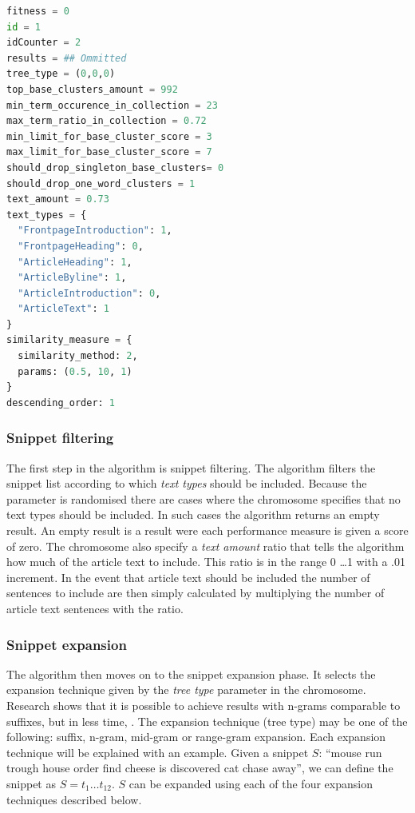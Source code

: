 \begin{lstlisting}[float=ht!, language=python, label=lst:chromosome, caption={An example chromosome}]
fitness = 0
id = 1
idCounter = 2
results = ## Ommitted
tree_type = (0,0,0)
top_base_clusters_amount = 992
min_term_occurence_in_collection = 23
max_term_ratio_in_collection = 0.72
min_limit_for_base_cluster_score = 3
max_limit_for_base_cluster_score = 7
should_drop_singleton_base_clusters= 0
should_drop_one_word_clusters = 1
text_amount = 0.73
text_types = {
  "FrontpageIntroduction": 1,
  "FrontpageHeading": 0,
  "ArticleHeading": 1,
  "ArticleByline": 1,
  "ArticleIntroduction": 0,
  "ArticleText": 1
}
similarity_measure = {
  similarity_method: 2,
  params: (0.5, 10, 1)
}
descending_order: 1
\end{lstlisting}

\subsubsection{Snippet filtering}
\label{subsubsec:snippetfiltering}
The first step in the \CTC algorithm is snippet filtering. The algorithm filters the snippet list according to which \emph{text types} should be included. Because the parameter is randomised there are cases where the chromosome specifies that no text types should be included. In such cases the algorithm returns an empty result. An empty result is a result were each performance measure is given a score of zero. The chromosome also specify a \emph{text amount} ratio that tells the algorithm how much of the article text to include. This ratio is in the range 0 \dots 1 with a .01 increment. In the event that article text should be included the number of sentences to include are then simply calculated by multiplying the number of article text sentences with the ratio.

\subsubsection{Snippet expansion}
\label{subsubsec:snippetexpansion}
The algorithm then moves on to the snippet expansion phase. It selects the expansion technique given by the \emph{tree type} parameter in the chromosome. Research shows that it is possible to achieve results with n-grams comparable to suffixes, but in less time, \parencite{Moe2014compact,Moe2014}. The expansion technique (tree type) may be one of the following: suffix, n-gram, mid-gram or range-gram expansion. Each expansion technique will be explained with an example. Given a snippet \(S\): ``mouse run trough house order find cheese is discovered cat chase away'', we can define the snippet as \(S = t_{1} \dots t_{12}\). \(S\) can be expanded using each of the four expansion techniques described below.

